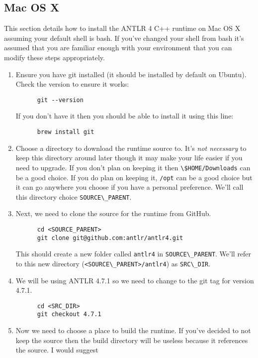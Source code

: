 \documentclass{article}
\begin{document}
\subsection{Mac OS X}
This section details how to install the ANTLR 4 C++ runtime on Mac OS X assuming your default shell
is bash. If you've changed your shell from bash it's assumed that you are familiar enough with your
environment that you can modify these steps appropriately.
\begin{enumerate}
  \item
    Ensure you have git installed (it should be installed by default on Ubuntu). Check the version
    to ensure it works:
    \begin{lstlisting}
      git --version
    \end{lstlisting}
    If you don't have it then you should be able to install it using this line:
    \begin{lstlisting}
      brew install git
    \end{lstlisting}
  \item
    Choose a directory to download the runtime source to. It's \emph{not necessary} to keep this
    directory around later though it may make your life easier if you need to upgrade. If you don't
    plan on keeping it then \lstinline{\$HOME/Downloads} can be a good choice. If you do plan on
    keeping it, \lstinline{/opt} can be a good choice but it can go anywhere you choose if you have
    a personal preference. We'll call this directory choice \lstinline{SOURCE\_PARENT}.
  \item
    Next, we need to clone the source for the runtime from GitHub.
    \begin{lstlisting}
      cd <SOURCE_PARENT>
      git clone git@github.com:antlr/antlr4.git
    \end{lstlisting}
    This should create a new folder called \lstinline{antlr4} in \lstinline{SOURCE\_PARENT}. We'll
    refer to this new directory (\lstinline{<SOURCE\_PARENT>/antlr4}) as \lstinline{SRC\_DIR}.
  \item
    We will be using ANTLR 4.7.1 so we need to change to the git tag for version 4.7.1.
    \begin{lstlisting}
      cd <SRC_DIR>
      git checkout 4.7.1
    \end{lstlisting}
  \item
    Now we need to choose a place to build the runtime. If you've decided to not keep the source
    then the build directory will be useless because it references the source. I would suggest

\end{enumerate}
\end{document}
